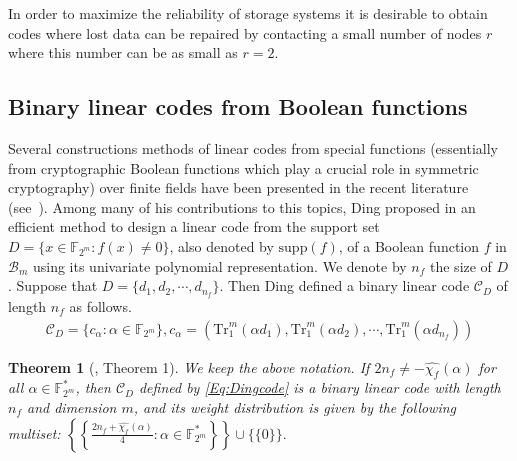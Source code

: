 \documentclass[10pt]{article}
\newtheorem{theorem}{Theorem}
\newtheorem{lemma}{Lemma}
\newcommand{\F}{\mathbb{F}}
\newcommand{\0}{\textbf{0}}
\newcommand{\1}{\textbf{1}}
\newcommand{\C}{{\mathcal C}}
\newcommand{\W}[2][]{\widehat{\chi_{#2}}^{#1}}
\begin{document}
In order to maximize the reliability of storage systems it is desirable to obtain codes where lost data can be repaired by contacting a small number of nodes  $r$ where this number can be as small as $r=2$.




\subsection{Binary linear codes from Boolean functions}\label{Sec-Binary-codes-Bool}
Several constructions methods of linear codes from special functions (essentially from cryptographic Boolean functions which play a
crucial role in symmetric cryptography) over finite fields have been presented in the recent literature (see~\cite{Mesnager-Handbook}).
Among many of his contributions to this topics, Ding proposed in \cite{DingIT2015} an efficient method to design a linear
code from the support set $D=\{x\in\F_{2^m}: f(x)\not=0\}$, also denoted by $\mathrm{supp}(f)$, of a Boolean function  $f$ in  $\mathcal{B}_m$ using its univariate polynomial representation.
We denote by $n_{f}$ the size of $D$. Suppose that $D=\{d_1,d_2,\cdots,d_{n_f}\}$. Then Ding defined a binary linear code $\C_{D}$ of
length $n_f$ as follows.
\begin{eqnarray}\label{Eq:Dingcode}
\C_{D}=\Big\{c_\alpha : \alpha\in\F_{2^m}\Big\}, c_\alpha=(\mathrm{Tr}_1^m(\alpha d_1),\mathrm{Tr}_1^m(\alpha d_2),\cdots,\mathrm{Tr}_1^m(\alpha d_{n_f}))
\end{eqnarray}
\begin{theorem}[\cite{DingDM16}, Theorem 1]\label{Lemma-ding}
We keep the above notation.  If $2n_f\not=-\W f(\alpha)$ for all $\alpha\in\F_{2^m}^*$,
then $\C_{D}$ defined by \eqref{Eq:Dingcode} is a binary linear code with length $n_f$ and dimension $m$, and its weight distribution
is given by the following multiset:
$\left\{\left\{\frac{2n_f+\W f(\alpha)}{4} : \alpha\in\F_{2^m}^*\right\}\right\}\cup \{\{0\}\}.$
\end{theorem}
\end{document}
